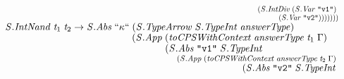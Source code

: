 \documentclass[10pt]{article}
\newcommand{\Conid}[1]{\mathit{#1}}
\newcommand{\Varid}[1]{\mathit{#1}}
\begin{document}
\begin{hscode}
${\hskip1.00em\relax\hskip1.00em\relax\phantom{\Conid{\Conid{S}.IntDiv}\;\Varid{t}_{1}\;\Varid{t}_{2}\to \Conid{\Conid{S}.Abs}\;\text{``}\kappa\text{``}\;\mbox{}}\phantom{(\Conid{\Conid{S}.App}\;\mbox{}}\phantom{(\Conid{\Conid{S}.Abs}\;\text{\tt \char34 v1\char34}\;\mbox{}}\phantom{(\Conid{\Conid{S}.App}\;\mbox{}}\phantom{(\Conid{\Conid{S}.Abs}\;\text{\tt \char34 v2\char34}\;\mbox{}}\phantom{(\Conid{\Conid{S}.App}\;\mbox{}}(\Conid{\Conid{S}.IntDiv}\;(\Conid{\Conid{S}.Var}\;\text{\tt \char34 v1\char34})\;}$\\
${\hskip1.00em\relax\hskip1.00em\relax\phantom{\Conid{\Conid{S}.IntDiv}\;\Varid{t}_{1}\;\Varid{t}_{2}\to \Conid{\Conid{S}.Abs}\;\text{``}\kappa\text{``}\;\mbox{}}\phantom{(\Conid{\Conid{S}.App}\;\mbox{}}\phantom{(\Conid{\Conid{S}.Abs}\;\text{\tt \char34 v1\char34}\;\mbox{}}\phantom{(\Conid{\Conid{S}.App}\;\mbox{}}\phantom{(\Conid{\Conid{S}.Abs}\;\text{\tt \char34 v2\char34}\;\mbox{}}\phantom{(\Conid{\Conid{S}.App}\;\mbox{}}\phantom{(\Conid{\Conid{S}.IntDiv}\;\mbox{}}(\Conid{\Conid{S}.Var}\;\text{\tt \char34 v2\char34})))))))}$\\
${\hskip1.00em\relax\hskip1.00em\relax\Conid{\Conid{S}.IntNand}\;\Varid{t}_{1}\;\Varid{t}_{2}\to \Conid{\Conid{S}.Abs}\;\text{``}\kappa\text{``}\;(\Conid{\Conid{S}.TypeArrow}\;\Conid{\Conid{S}.TypeInt}\;\Varid{answerType})\;}$\\
${\hskip1.00em\relax\hskip1.00em\relax\phantom{\Conid{\Conid{S}.IntNand}\;\Varid{t}_{1}\;\Varid{t}_{2}\to \Conid{\Conid{S}.Abs}\;\text{``}\kappa\text{``}\;\mbox{}}(\Conid{\Conid{S}.App}\;(\Varid{toCPSWithContext}\;\Varid{answerType}\;\Varid{t}_{1}\;\Gamma)\;}$\\
${\hskip1.00em\relax\hskip1.00em\relax\phantom{\Conid{\Conid{S}.IntNand}\;\Varid{t}_{1}\;\Varid{t}_{2}\to \Conid{\Conid{S}.Abs}\;\text{``}\kappa\text{``}\;\mbox{}}\phantom{(\Conid{\Conid{S}.App}\;\mbox{}}(\Conid{\Conid{S}.Abs}\;\text{\tt \char34 v1\char34}\;\Conid{\Conid{S}.TypeInt}\;}$\\
${\hskip1.00em\relax\hskip1.00em\relax\phantom{\Conid{\Conid{S}.IntNand}\;\Varid{t}_{1}\;\Varid{t}_{2}\to \Conid{\Conid{S}.Abs}\;\text{``}\kappa\text{``}\;\mbox{}}\phantom{(\Conid{\Conid{S}.App}\;\mbox{}}\phantom{(\Conid{\Conid{S}.Abs}\;\text{\tt \char34 v1\char34}\;\mbox{}}(\Conid{\Conid{S}.App}\;(\Varid{toCPSWithContext}\;\Varid{answerType}\;\Varid{t}_{2}\;\Gamma)\;}$\\
${\hskip1.00em\relax\hskip1.00em\relax\phantom{\Conid{\Conid{S}.IntNand}\;\Varid{t}_{1}\;\Varid{t}_{2}\to \Conid{\Conid{S}.Abs}\;\text{``}\kappa\text{``}\;\mbox{}}\phantom{(\Conid{\Conid{S}.App}\;\mbox{}}\phantom{(\Conid{\Conid{S}.Abs}\;\text{\tt \char34 v1\char34}\;\mbox{}}\phantom{(\Conid{\Conid{S}.App}\;\mbox{}}(\Conid{\Conid{S}.Abs}\;\text{\tt \char34 v2\char34}\;\Conid{\Conid{S}.TypeInt}\;}$\\

\end{hscode}
\end{document}
